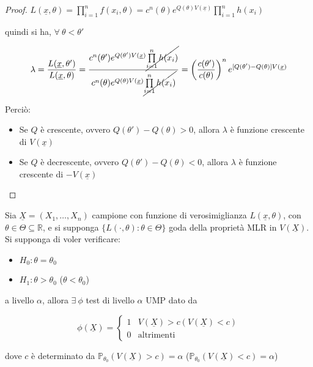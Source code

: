 \documentclass[hidelinks, 10pt]{report}
\begin{document}
\begin{proof}
$ L(\underline{x}, \theta) = \prod\limits_{i = 1}^{n} f(x_{i}, \theta) = c^{n} (\theta) e^{Q(\theta) V(\underline{x})} \prod\limits_{i = 1}^{n} h(x_{i}) $

quindi si ha, $ \forall\ \theta < \theta' $

\[ \lambda = \frac{L(\underline{x}, \theta')}{L(\underline{x}, \theta)} = \frac{c^{n} (\theta') e^{Q(\theta') V(\underline{x})} \cancel{\prod\limits_{i = 1}^{n} h(x_{i})}}{c^{n} (\theta) e^{Q(\theta) V(\underline{x})} \cancel{\prod\limits_{i = 1}^{n} h(x_{i})}} = \left( \frac{c(\theta')}{c(\theta)} \right)^{n} e^{[Q(\theta') - Q(\theta)]V(\underline{x})} \]

Perci\`o:
\begin{itemize}
\item Se $ Q $ \`e crescente, ovvero $ Q(\theta') - Q(\theta) > 0 $, allora $ \lambda $ \`e funzione crescente di $ V(\underline{x}) $
\item Se $ Q $ \`e decrescente, ovvero $ Q(\theta') - Q(\theta) < 0 $, allora $ \lambda $ \`e funzione crescente di $ -V(\underline{x}) $
\end{itemize}
\end{proof}

\begin{thm}
Sia $ \underline{X} = (X_{1}, \dotsc, X_{n}) $ campione con funzione di verosimiglianza $ L(\underline{x}, \theta) $, con $ \theta \in \Theta \subseteq \mathbb{R} $, e si supponga $ \{ L(\cdot, \theta) : \theta \in \Theta \} $ goda della propriet\`a MLR in $ V(\underline{X}) $. Si supponga di voler verificare:
\begin{itemize}
\item $ H_{0} : \theta = \theta_{0} $
\item $ H_{1} : \theta > \theta_{0} $ ($ \theta < \theta_{0} $)
\end{itemize}
a livello $ \alpha $, allora $ \exists\ \phi $ test di livello $ \alpha $ UMP dato da

\[ \phi(\underline{X}) = \begin{cases}
1 & V(\underline{X}) > c (V(\underline{X}) < c) \\
0 & \text{altrimenti}
\end{cases} \]

dove $ c $ \`e determinato da $ \mathbb{P}_{\theta_{0}} (V(\underline{X}) > c) = \alpha $ ($ \mathbb{P}_{\theta_{0}} (V(\underline{X}) < c) = \alpha $)
\end{thm}
\end{document}
